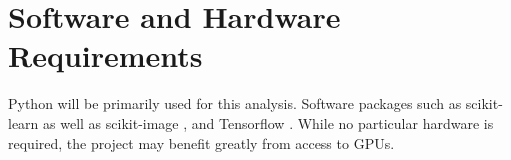 \documentclass[11pt, a4paper]{article}
\begin{document}
\section*{Software and Hardware Requirements}
Python will be primarily used for this analysis. Software packages such as scikit-learn \cite{scikit-learn} as well as  scikit-image \cite{van2014scikit}, and Tensorflow \cite{tensorflow2015-whitepaper}. While no particular hardware is required, the project may benefit greatly from access to GPUs.



\end{document}
